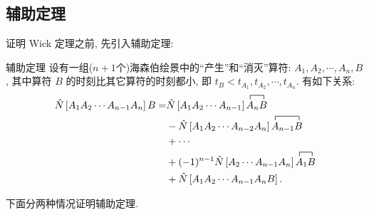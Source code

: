 \subsection{辅助定理}
证明 Wick 定理之前, 先引入辅助定理: 
\begin{theorem}{辅助定理}{}
设有一组($n+1$个)海森伯绘景中的“产生”和“消灭”算符: $A_{1}, A_{2}, \cdots, A_{n}, B$, 其中算符 $B$ 的时刻比其它算符的时刻都小, 即 $t_{B}<t_{A_{1}},t_{A_{2}},\cdots,t_{A_{n}}$. 有如下关系:
\begin{align}
\hat{N}\left[A_{1} A_{2} \cdots A_{n-1}A_{n}\right] B=& \hat{N}\left[A_{1} A_{2} \cdots A_{n-1}\right]\contraction{}{A}{_{n}}{B} {A_{n} B}\nonumber\\ 
&-\hat{N}\left[A_{1} A_{2} \cdots A_{n-2} A_{n}\right]\contraction{}{A}{_{n-1}}{B} A_{n-1} B\nonumber\\ 
&+\cdots \nonumber\\
&+(-1)^{n-1} \hat{N}\left[A_{2} \cdots A_{n-1}A_{n}\right]\contraction{}{A}{_{1}}{B} A_{1} B\nonumber\\ 
& +\hat{N}\left[A_{1} A_{2} \cdots A_{n-1}A_{n} B\right].
\end{align}
\end{theorem}
下面分两种情况证明辅助定理.
